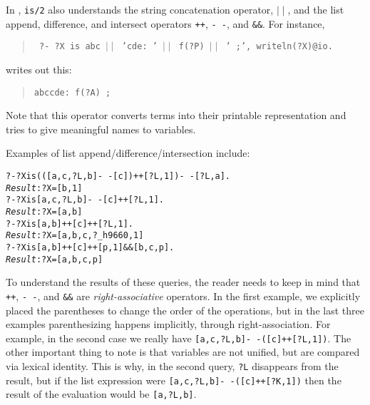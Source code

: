   In \ERGO, \texttt{\bs{}is/2} also understands
  the string concatenation operator, $\mid\mid$,
  and the list append, difference, and intersect operators \texttt{++},
  \texttt{-\,-}, and \texttt{\&\&}. 
  For instance,
  \begin{quote}
    {\tt
   ?- ?X \bs{}is abc $\mid\mid$ 'cde: ' $\mid\mid$ f(?P) $\mid\mid$  ' ;',
   writeln(?X)@\bs{}io.
   }
  \end{quote}
   writes out this:
  \begin{quote}
   \texttt{abccde: f(?A) ;}
  \end{quote}
  Note that this operator converts terms into their printable
  representation and tries to give meaningful names to variables.

  Examples of list append/difference/intersection include:
\begin{alltt}
   ?- ?X \bs{}is (([a,c,?L,b]-\,-[c])++[?L,1]) -\,- [?L,a].\\
   {\it Result\/}: ?X = [b, 1]\\

   ?- ?X \bs{}is [a,c,?L,b]-\,-[c]++[?L,1].\\
   {\it Result\/}: ?X = [a, b]\\

   ?- ?X \bs{}is [a,b]++[c]++[?L,1].\\
   {\it Result\/}: ?X = [a, b, c, ?\_h9660, 1]\\

   ?- ?X \bs{}is [a,b]++[c]++[p,1]&&[b,c,p].  \\
   {\it Result\/} :?X = [a, b, c, p]
\end{alltt}
  To understand the results of these queries, the reader needs to keep in
  mind that
  \texttt{++}, \texttt{-\,-}, and \texttt{\&\&} 
  are \emph{right-associative} operators. In the first
  example, we explicitly placed the parentheses to change the order of the
  operations, but in the last three examples parenthesizing happens
  implicitly, through right-association. For example, in the second case we
  really have \texttt{[a,c,?L,b]-\,-([c]++[?L,1])}. The other important thing
  to note is that variables are not unified, but are compared via lexical
  identity. This is why, in the second query, \texttt{?L} disappears from
  the result, but if the list expression were
  \texttt{[a,c,?L,b]-\,-([c]++[?K,1])} then the result of the evaluation
  would be \texttt{[a,?L,b]}. 

